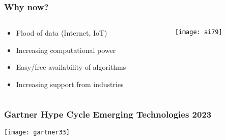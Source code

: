 \begin{frame}[fragile]\frametitle{Why now?}


\begin{columns}
    \begin{column}[T]{0.6\linewidth}

\begin{itemize}
\item Flood of data (Internet, IoT)
\item Increasing computational power
\item Easy/free availability of algorithms 
\item Increasing support from industries
\end{itemize}


    \end{column}
    \begin{column}[T]{0.4\linewidth}

			\begin{center}
			\texttt{[image: ai79]}
			\end{center}
			
    \end{column}
  \end{columns}
\end{frame}

\begin{frame}[fragile]\frametitle{Gartner Hype Cycle Emerging Technologies 2023}
	
	\begin{center}
	\texttt{[image: gartner33]}
	\end{center}

\end{frame}






